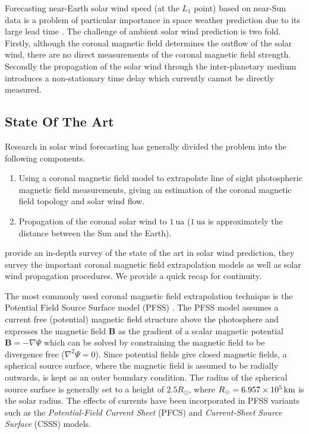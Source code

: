 Forecasting near-Earth solar wind speed (at the $L_1$ point) based on near-Sun data is a problem of particular 
importance in space weather prediction due to its large lead time \citep{doi:10.1002/jgra.50429,doi:10.1029/2009SW000542}. 
The challenge of ambient solar wind prediction is two fold. Firstly, although the coronal magnetic field determines the 
outflow of the solar wind, there are no direct measurements of the coronal magnetic field strength. Secondly the 
propagation of the solar wind through the inter-planetary medium introduces a non-stationary time delay which currently cannot 
be directly measured. 

\subsection{State Of The Art}
Research in solar wind forecasting has generally divided the problem into the following components.
%
\begin{enumerate} 
  \item Using a coronal magnetic field model to extrapolate line of sight photospheric magnetic field measurements, 
        giving an estimation of the coronal magnetic field topology and solar wind flow.
  \item Propagation of the coronal solar wind to $\SI{1}{\astronomicalunit}$ ($\SI{1}{\astronomicalunit}$ is 
        approximately the distance between the Sun and the Earth).
\end{enumerate} 
%
\citet{Reiss_2019} provide an in-depth survey of the state of the art in solar wind prediction, they survey the 
important coronal magnetic field extrapolation models as well as solar wind propagation procedures. We provide 
a quick recap for continuity.

The most commonly used coronal magnetic field extrapolation technique is the Potential Field Source Surface model (PFSS) 
\citep{altschuler1969magnetic,schatten1969model}. The PFSS model assumes a current free (potential) magnetic field 
structure above the photosphere and expresses the magnetic field $\mathbf{B}$ as the gradient of a scalar magnetic 
potential $\mathbf{B} = -\nabla \Psi$ which can be solved by constraining the magnetic field to be divergence free 
($\nabla^{2}\Psi = 0$). Since potential fields give closed magnetic fields, a spherical source surface, where the 
magnetic field is assumed to be radially outwards, is kept as an outer boundary condition. The radius of the spherical 
source surface is generally set to a height of $2.5 R_{\odot}$, where $R_{\odot} = \SI{6.957d5}{\kilo\metre}$ is the 
solar radius. The effects of currents have been incorporated in PFSS variants such as the 
\emph{Potential-Field Current Sheet} (PFCS) \citep{schatten1971current} and \emph{Current-Sheet Source Surface} (CSSS) 
\citep{csss} models. 

